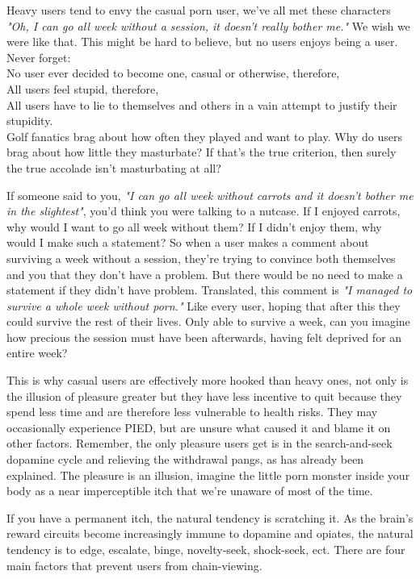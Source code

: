 \documentclass[easypeasy]{subfiles}
\begin{document}
Heavy users tend to envy the casual porn user, we've all met these characters \textit{"Oh, I can go all week without a session, it doesn't really bother me."} We wish we were like that. This might be hard to believe, but no users enjoys being a user. Never forget:\\

      No user ever decided to become one, casual or otherwise, therefore, \\
      All users feel stupid, therefore, \\
      All users have to lie to themselves and others in a vain attempt to justify their stupidity. \\

Golf fanatics brag about how often they played and want to play. Why do users brag about how little they masturbate? If that's the true criterion, then surely the true accolade isn't masturbating at all?

If someone said to you, \textit{"I can go all week without carrots and it doesn't bother me in the slightest"}, you'd think you were talking to a nutcase. If I enjoyed carrots, why would I want to go all week without them? If I didn't enjoy them, why would I make such a statement? So when a user makes a comment about surviving a week without a session, they're trying to convince both themselves and you that they don't have a problem. But there would be no need to make a statement if they didn't have problem. Translated, this comment is \textit{"I managed to survive a whole week without porn."} Like every user, hoping that after this they could survive the rest of their lives. Only able to survive a week, can you imagine how precious the session must have been afterwards, having felt deprived for an entire week?

This is why casual users are effectively more hooked than heavy ones, not only is the illusion of pleasure greater but they have less incentive to quit because they spend less time and are therefore less vulnerable to health risks. They may occasionally experience PIED, but are unsure what caused it and blame it on other factors. Remember, the only pleasure users get is in the search-and-seek dopamine cycle and relieving the withdrawal pangs, as has already been explained. The pleasure is an illusion, imagine the little porn monster inside your body as a near imperceptible itch that we're unaware of most of the time.

If you have a permanent itch, the natural tendency is scratching it. As the brain's reward circuits become increasingly immune to dopamine and opiates, the natural tendency is to edge, escalate, binge, novelty-seek, shock-seek, ect. There are four main factors that prevent users from chain-viewing.
\end{document}
